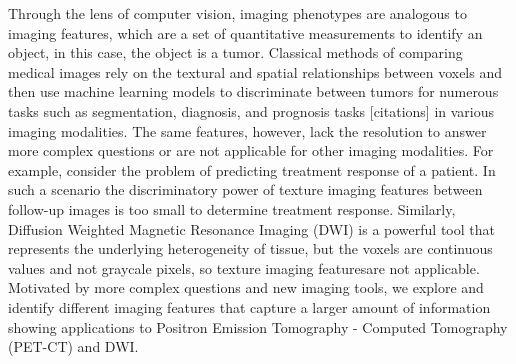 Through the lens of computer vision, imaging phenotypes are analogous to imaging features, which are a set of quantitative measurements to identify an object, in this case, the object is a tumor.  Classical methods of comparing medical images rely on the textural and spatial relationships between voxels and then use machine learning models to discriminate between tumors for numerous tasks such as segmentation, diagnosis, and prognosis tasks [citations] in various imaging modalities.  The same features, however, lack the resolution to answer more complex questions or are not applicable for other imaging modalities.  For example, consider the problem of predicting treatment response of a patient.  In such a scenario the discriminatory power of texture imaging features between follow-up images is too small to determine treatment response.  Similarly, Diffusion Weighted Magnetic Resonance Imaging (DWI) is a powerful tool that represents the underlying heterogeneity of tissue, but the voxels are continuous values and not graycale pixels, so texture imaging featuresare not applicable.  Motivated by more complex questions and new imaging tools, we explore and identify different imaging features that capture a larger amount of information showing applications to Positron Emission Tomography - Computed Tomography (PET-CT) and DWI.  

